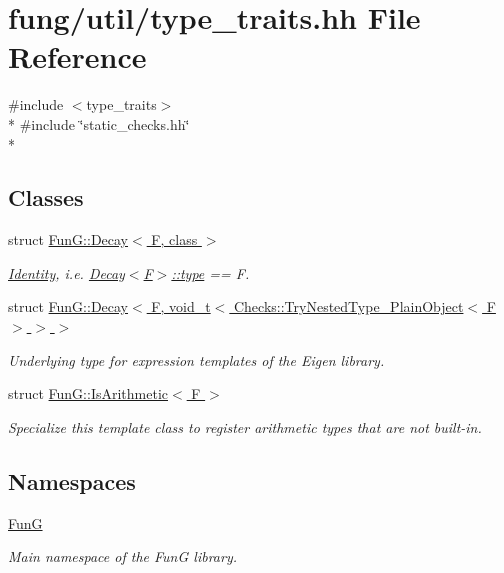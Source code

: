 \hypertarget{type__traits_8hh}{}\section{fung/util/type\+\_\+traits.hh File Reference}
\label{type__traits_8hh}
{\ttfamily \#include $<$type\+\_\+traits$>$}\\*
{\ttfamily \#include \char`\"{}static\+\_\+checks.\+hh\char`\"{}}\\*
\subsection*{Classes}
\begin{DoxyCompactItemize}
\item 
struct \hyperlink{structFunG_1_1Decay}{Fun\+G\+::\+Decay$<$ F, class $>$}
\begin{DoxyCompactList}\small\item\em \hyperlink{structFunG_1_1Identity}{Identity}, i.\+e. \hyperlink{structFunG_1_1Decay_a4b2916cbb7c8587ab3fccc9b896b9df4}{Decay$<$\+F$>$\+::type} == F. \end{DoxyCompactList}\item 
struct \hyperlink{structFunG_1_1Decay_3_01F_00_01void__t_3_01Checks_1_1TryNestedType__PlainObject_3_01F_01_4_01_4_01_4}{Fun\+G\+::\+Decay$<$ F, void\+\_\+t$<$ Checks\+::\+Try\+Nested\+Type\+\_\+\+Plain\+Object$<$ F $>$ $>$ $>$}
\begin{DoxyCompactList}\small\item\em Underlying type for expression templates of the Eigen library. \end{DoxyCompactList}\item 
struct \hyperlink{structFunG_1_1IsArithmetic}{Fun\+G\+::\+Is\+Arithmetic$<$ F $>$}
\begin{DoxyCompactList}\small\item\em Specialize this template class to register arithmetic types that are not built-\/in. \end{DoxyCompactList}\end{DoxyCompactItemize}
\subsection*{Namespaces}
\begin{DoxyCompactItemize}
\item 
 \hyperlink{namespaceFunG}{Fun\+G}
\begin{DoxyCompactList}\small\item\em Main namespace of the Fun\+G library. \end{DoxyCompactList}\end{DoxyCompactItemize}
